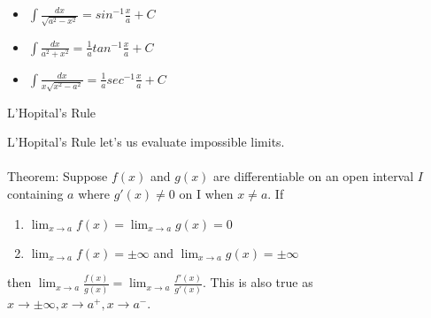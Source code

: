 \documentclass{article}
\begin{document}
\begin{itemize}
  \item {
  $\int\frac{dx}{\sqrt{a^2 - x^2}} = sin^{-1}\frac{x}{a}+C$
  }
  \item {
  $\int\frac{dx}{a^2 + x^2} = \frac{1}{a}tan^{-1}\frac{x}{a}+C$
  }
  \item {
  $\int\frac{dx}{x\sqrt{x^2 - a^2}} = \frac{1}{a}sec^{-1}\frac{x}{a}+C$
  }
\end{itemize}

\noindent
\Large L'Hopital's Rule\\
\normalsize
\noindent

L'Hopital's Rule let's us evaluate impossible limits.\\\\

\noindent
Theorem: Suppose $f(x)$ and $g(x)$ are differentiable on an open interval $I$ containing $a$ where $g'(x) \neq 0$ on I when $x \neq a$. If
\begin{enumerate}
  \item $\lim_{x \to a}f(x) = \lim_{x \to a}g(x) = 0$
  \item $\lim_{x \to a}f(x) = \pm\infty$ and $\lim_{x \to a}g(x) = \pm\infty$
\end{enumerate}
then $\lim_{x \to a}\frac{f(x)}{g(x)} = \lim_{x \to a}\frac{f'(x)}{g'(x)}$. This is also true as $x \to \pm\infty, x \to a^+, x \to a^-$.
\end{document}
